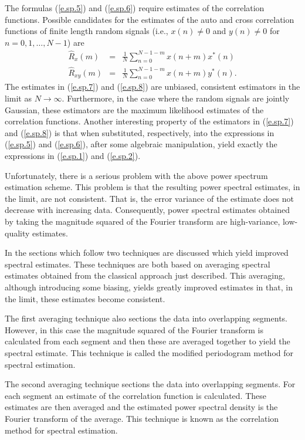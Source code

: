 The formulas (\ref{e.sp.5}) and (\ref{e.sp.6})  require estimates of 
the correlation functions.
Possible candidates for the estimates of the auto and cross
correlation functions of finite length random signals
(i.e., $x(n)\ne0$ and $y(n)\ne0$ for $n=0,1,\ldots,N-1$) are
%
\begin{eqnarray}
\hat{R}_x(m)&=&\frac{1}{N}\sum_{n=0}^{N-1-m}x(n+m)x^*(n)
\label{e.sp.7}\\
\hat{R}_{xy}(m)&=&\frac{1}{N}\sum_{n=0}^{N-1-m}x(n+m)y^*(n).
\label{e.sp.8}
\end{eqnarray}
%
The estimates in (\ref{e.sp.7}) and (\ref{e.sp.8}) are unbiased, 
consistent estimators in the limit as $N\rightarrow\infty$.  
Furthermore, in the 
case where the random signals are jointly Gaussian, these
estimators are the maximum likelihood estimates of the correlation
functions.  Another interesting property of 
the estimators in (\ref{e.sp.7}) and (\ref{e.sp.8}) is that
when substituted, respectively, into the expressions in 
(\ref{e.sp.5}) and (\ref{e.sp.6}), after some algebraic
manipulation, yield exactly the expressions in (\ref{e.sp.1})
and (\ref{e.sp.2}).

	Unfortunately, there is a serious problem with the 
above power spectrum estimation scheme.  This problem is that the 
resulting power spectral estimates, in the limit, are
not consistent.  That is, the error variance
of the estimate does not decrease with increasing data.
Consequently, power spectral estimates obtained
by taking the magnitude squared of the Fourier transform
are high-variance, low-quality estimates.

	In the sections which follow two
techniques are discussed which yield improved
spectral estimates.  These techniques are both based on averaging
spectral estimates obtained
from the classical approach just described.  This
averaging, although introducing some biasing,
yields greatly improved estimates in that, in the
limit, these estimates become consistent.

	The first averaging technique also sections
the data into overlapping segments.  However, in this
case the magnitude squared of the Fourier
transform is calculated from each segment and then these
are averaged together to yield the spectral estimate.
This technique is called the modified periodogram
method for spectral estimation.

	The second averaging technique sections the data
into overlapping segments.  For each segment an estimate of
the correlation function is calculated.  These estimates are
then averaged and the estimated power spectral density
is the Fourier transform of the average.  This technique is known
as the correlation method for spectral estimation.

